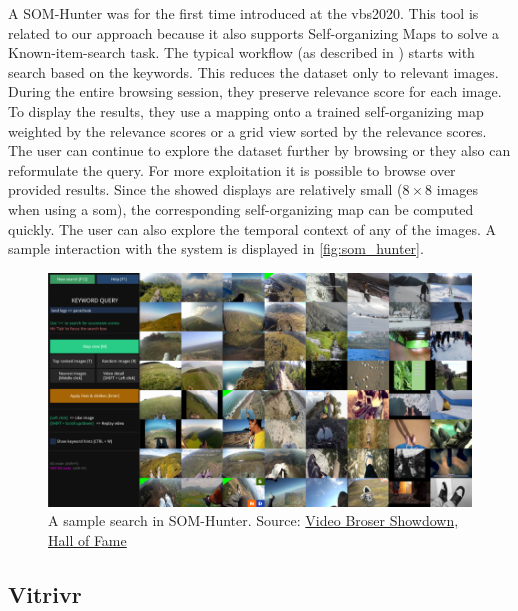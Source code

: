 A SOM-Hunter was for the first time introduced at the \acrshort{vbs}2020. This tool is related to our approach because it also supports Self-organizing Maps to solve a Known-item-search task. The typical workflow (as described in \cite{kratochvil2020som}) starts with search based on the keywords. This reduces the dataset only to relevant images. During the entire browsing session, they preserve relevance score for each image. To display the results, they use a mapping onto a trained self-organizing map weighted by the relevance scores or a grid view sorted by the relevance scores. The user can continue to explore the dataset further by browsing or they also can reformulate the query. For more exploitation it is possible to browse over provided results. Since the showed displays are relatively small ($8\times8$ images when using a \acrshort{som}), the corresponding self-organizing map can be computed quickly. The user can also explore the temporal context of any of the images. A sample interaction with the system is displayed in \autoref{fig:som_hunter}.


\begin{figure}
    \centering
    \includegraphics[width=0.99\linewidth]{img/som_hunter_small.png}
    \caption{A sample search in SOM-Hunter. Source: \href{https://videobrowsershowdown.org/hall-of-fame/}{Video Broser Showdown, Hall of Fame}}
    \label{fig:som_hunter}
\end{figure}

\subsection{Vitrivr}

